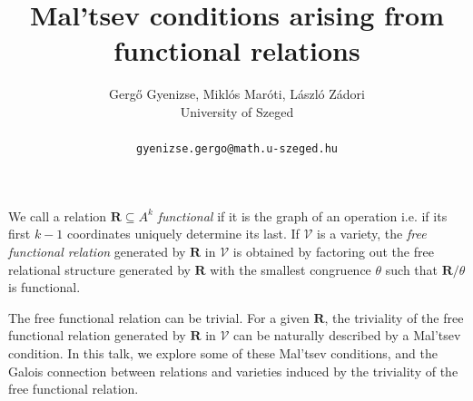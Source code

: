 \documentclass[a4paper]{article} %
\date{} %
\begin{document}
\setcounter{page}{1} %

\title{Mal'tsev conditions arising from functional relations}

\author{Gerg\H{o} Gyenizse, Mikl\'os Mar\'oti, L\'aszl\'o Z\'adori \\ %
       University of Szeged\\ \\ %
       \texttt{gyenizse.gergo@math.u-szeged.hu} %
       }%

\maketitle


We call a relation $\mathbf R\subseteq A^k$ {\em functional} if it is the graph of an operation i.e. if its first $k-1$ coordinates uniquely determine its last. If $\mathcal V$ is a variety, the {\em free functional relation} generated by $\mathbf R$ in $\mathcal V$ is obtained by factoring out the free relational structure generated by $\mathbf R$ with the smallest congruence $\theta$ such that $\mathbf R\slash\theta$ is functional.

The free functional relation can be trivial. For a given $\mathbf R$, the triviality of the free functional relation generated by $\mathbf R$ in $\mathcal V$ can be naturally described by a Mal'tsev condition. In this talk, we explore some of these Mal'tsev conditions, and the Galois connection between relations and varieties induced by the triviality of the free functional relation. 
\end{document}
